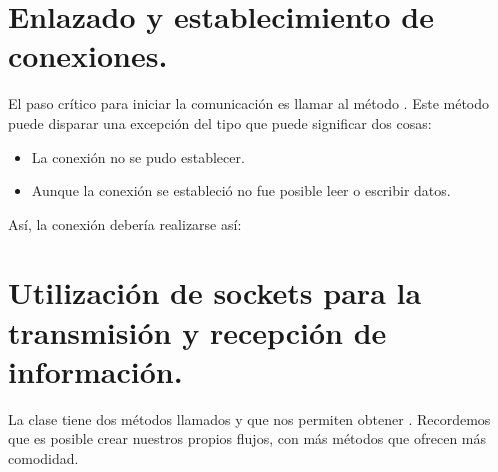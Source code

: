 \documentclass[letterpaper,10pt,spanish]{sphinxmanual}
\begin{document}
\section{Enlazado y establecimiento de conexiones.}
\label{\detokenize{textos/tema3:enlazado-y-establecimiento-de-conexiones}}
El paso crítico para iniciar la comunicación es llamar al método . Este método puede disparar una excepción del tipo  que puede significar dos cosas:
\begin{itemize}
\item {} 
La conexión no se pudo establecer.

\item {} 
Aunque la conexión se estableció no fue posible leer o escribir datos.

\end{itemize}

Así, la conexión debería realizarse así:

\begin{sphinxVerbatim}[commandchars=\\\{\}]
 

         
         

  
   
 
\end{sphinxVerbatim}


\section{Utilización de sockets para la transmisión y recepción de información.}
\label{\detokenize{textos/tema3:utilizacion-de-sockets-para-la-transmision-y-recepcion-de-informacion}}
La clase  tiene dos métodos llamados  y  que nos permiten obtener . Recordemos que es posible crear nuestros propios flujos, con más métodos que ofrecen más comodidad.
\end{document}
